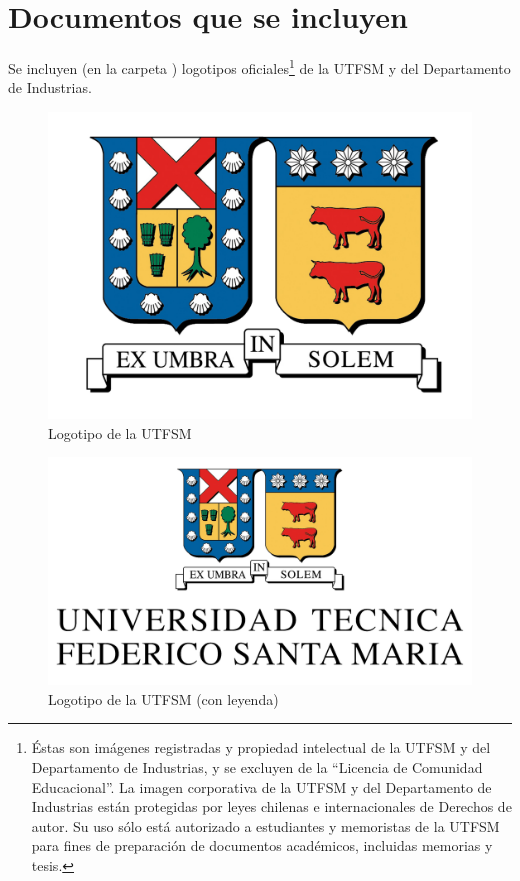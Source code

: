 \section{Documentos que se incluyen}

Se incluyen (en la carpeta ) logotipos oficiales\footnote{Éstas son imágenes registradas y propiedad intelectual de la UTFSM y del Departamento de Industrias, y se excluyen de la ``Licencia de Comunidad Educacional''. La imagen corporativa de la UTFSM y del Departamento de Industrias están protegidas por leyes chilenas e internacionales de Derechos de autor. Su uso sólo está autorizado a estudiantes y memoristas de la UTFSM para fines de preparación de documentos académicos, incluidas memorias y tesis.}
de la UTFSM y del Departamento de Industrias.

\begin{figure}[ht!]
\centering
\includegraphics[scale = .8]{figures/logousm.png}
\caption{Logotipo de la UTFSM}
\label{fig:logousm}
\end{figure}

\begin{figure}[ht!]
\centering
\includegraphics[scale = .5]{figures/logousmleyenda.png}
\caption{Logotipo de la UTFSM (con leyenda)}
\label{fig:logousmleyenda}
\end{figure}


